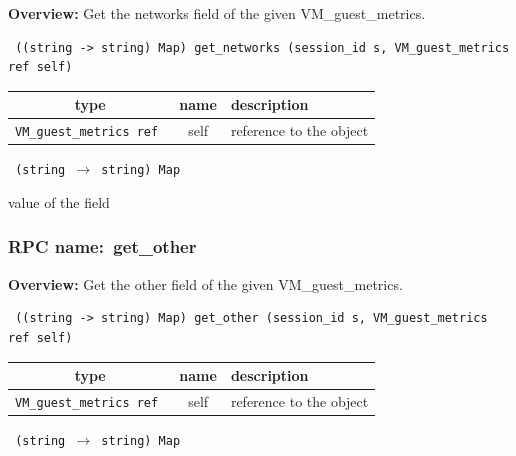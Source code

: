{\bf Overview:} 
Get the networks field of the given VM\_guest\_metrics.

\begin{verbatim} ((string -> string) Map) get_networks (session_id s, VM_guest_metrics ref self)\end{verbatim}



 
\vspace{0.3cm}
\begin{tabular}{|c|c|p{7cm}|}
 \hline
{\bf type} & {\bf name} & {\bf description} \\ \hline
{\tt VM\_guest\_metrics ref } & self & reference to the object \\ \hline 

\end{tabular}

\vspace{0.3cm}

{\tt 
(string $\rightarrow$ string) Map
}


value of the field
\vspace{0.3cm}
\vspace{0.3cm}
\vspace{0.3cm}
\subsubsection{RPC name:~get\_other}

{\bf Overview:} 
Get the other field of the given VM\_guest\_metrics.

\begin{verbatim} ((string -> string) Map) get_other (session_id s, VM_guest_metrics ref self)\end{verbatim}



 
\vspace{0.3cm}
\begin{tabular}{|c|c|p{7cm}|}
 \hline
{\bf type} & {\bf name} & {\bf description} \\ \hline
{\tt VM\_guest\_metrics ref } & self & reference to the object \\ \hline 

\end{tabular}

\vspace{0.3cm}

{\tt 
(string $\rightarrow$ string) Map
}


